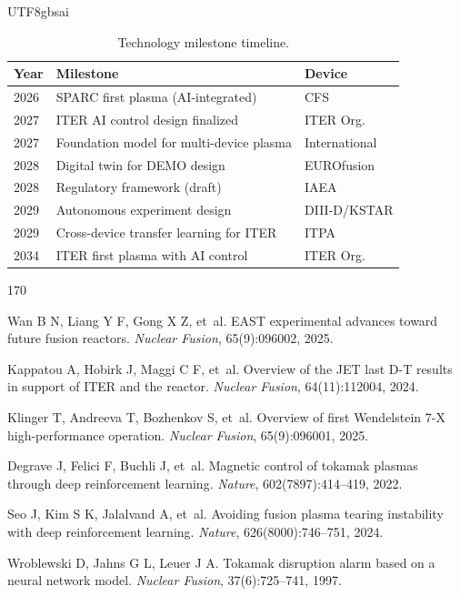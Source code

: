 \documentclass[12pt,a4paper]{article}
\begin{document}
\begin{CJK}{UTF8}{gbsai}
\begin{table}[htbp]
\centering
\caption{Technology milestone timeline.}
\label{tab:roadmap}
\begin{tabular}{lll}
\toprule
Year & Milestone & Device \\
\midrule
2026 & SPARC first plasma (AI-integrated) & CFS \\
2027 & ITER AI control design finalized & ITER Org. \\
2027 & Foundation model for multi-device plasma & International \\
2028 & Digital twin for DEMO design & EUROfusion \\
2028 & Regulatory framework (draft) & IAEA \\
2029 & Autonomous experiment design & DIII-D/KSTAR \\
2029 & Cross-device transfer learning for ITER & ITPA \\
2034 & ITER first plasma with AI control & ITER Org. \\
\bottomrule
\end{tabular}
\end{table}

\begin{thebibliography}{170}

Wan B N, Liang Y F, Gong X Z, et~al.
\newblock EAST experimental advances toward future fusion reactors.
\newblock \textit{Nuclear Fusion}, 65(9):096002, 2025.

Kappatou A, Hobirk J, Maggi C F, et~al.
\newblock Overview of the JET last D-T results in support of ITER and the reactor.
\newblock \textit{Nuclear Fusion}, 64(11):112004, 2024.

Klinger T, Andreeva T, Bozhenkov S, et~al.
\newblock Overview of first Wendelstein 7-X high-performance operation.
\newblock \textit{Nuclear Fusion}, 65(9):096001, 2025.

Degrave J, Felici F, Buchli J, et~al.
\newblock Magnetic control of tokamak plasmas through deep reinforcement learning.
\newblock \textit{Nature}, 602(7897):414--419, 2022.

Seo J, Kim S K, Jalalvand A, et~al.
\newblock Avoiding fusion plasma tearing instability with deep reinforcement learning.
\newblock \textit{Nature}, 626(8000):746--751, 2024.

Wroblewski D, Jahns G L, Leuer J A.
\newblock Tokamak disruption alarm based on a neural network model.
\newblock \textit{Nuclear Fusion}, 37(6):725--741, 1997.


\end{thebibliography}
\end{CJK}
\end{document}
